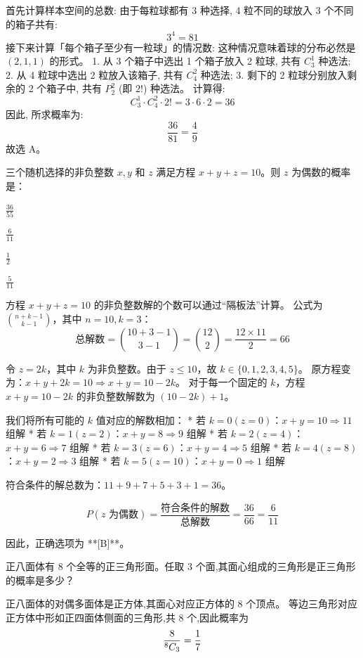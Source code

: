 \begin{questions}
\begin{solution}
首先计算样本空间的总数:
由于每粒球都有 3 种选择, 4 粒不同的球放入 3 个不同的箱子共有:
\[
3^4 = 81
\]
接下来计算「每个箱子至少有一粒球」的情况数:
这种情况意味着球的分布必然是 $(2, 1, 1)$ 的形式。
1. 从 3 个箱子中选出 1 个箱子放入 2 粒球, 共有 $C_3^1$ 种选法;
2. 从 4 粒球中选出 2 粒放入该箱子, 共有 $C_4^2$ 种选法;
3. 剩下的 2 粒球分别放入剩余的 2 个箱子中, 共有 $P_2^2$ (即 $2!$) 种选法。
计算得:
\[
C_3^1 \cdot C_4^2 \cdot 2! = 3 \cdot 6 \cdot 2 = 36
\]
因此, 所求概率为:
\[
\frac{36}{81} = \frac{4}{9}
\]
故选 A。
\end{solution}

\question 
三个随机选择的非负整数 $x, y$ 和 $z$ 满足方程 $x + y + z = 10$。则 $z$ 为偶数的概率是：
\begin{choices}
    \item $\frac{36}{55}$
    \item $\frac{6}{11}$
    \item $\frac{1}{2}$
    \item $\frac{5}{11}$
\end{choices}

\begin{solution}
方程 $x + y + z = 10$ 的非负整数解的个数可以通过“隔板法”计算。
公式为 $\binom{n+k-1}{k-1}$，其中 $n=10, k=3$：
\[ \text{总解数} = \binom{10+3-1}{3-1} = \binom{12}{2} = \frac{12 \times 11}{2} = 66 \]

令 $z = 2k$，其中 $k$ 为非负整数。由于 $z \leq 10$，故 $k \in \{0, 1, 2, 3, 4, 5\}$。
原方程变为：$x + y + 2k = 10 \Rightarrow x + y = 10 - 2k$。
对于每一个固定的 $k$，方程 $x + y = 10 - 2k$ 的非负整数解数为 $(10 - 2k) + 1$。

我们将所有可能的 $k$ 值对应的解数相加：
* 若 $k=0 (z=0)$：$x+y=10 \Rightarrow 11$ 组解
* 若 $k=1 (z=2)$：$x+y=8 \Rightarrow 9$ 组解
* 若 $k=2 (z=4)$：$x+y=6 \Rightarrow 7$ 组解
* 若 $k=3 (z=6)$：$x+y=4 \Rightarrow 5$ 组解
* 若 $k=4 (z=8)$：$x+y=2 \Rightarrow 3$ 组解
* 若 $k=5 (z=10)$：$x+y=0 \Rightarrow 1$ 组解

符合条件的解总数为：$11 + 9 + 7 + 5 + 3 + 1 = 36$。

\[ P(z \text{ 为偶数}) = \frac{\text{符合条件的解数}}{\text{总解数}} = \frac{36}{66} = \frac{6}{11} \]

因此，正确选项为 **[B]**。
\end{solution}
    \question 正八面体有 $8$ 个全等的正三角形面。任取 $3$ 个面,其面心组成的三角形是正三角形的概率是多少？
    \begin{solution}
        正八面体的对偶多面体是正方体,其面心对应正方体的 $8$ 个顶点。  
        等边三角形对应正方体中形如正四面体侧面的三角形,共 $8$ 个,因此概率为
        \[
        \frac{8}{{}^{8}C_{3}} = \frac{1}{7}
        \]
    \end{solution}


\end{questions}
